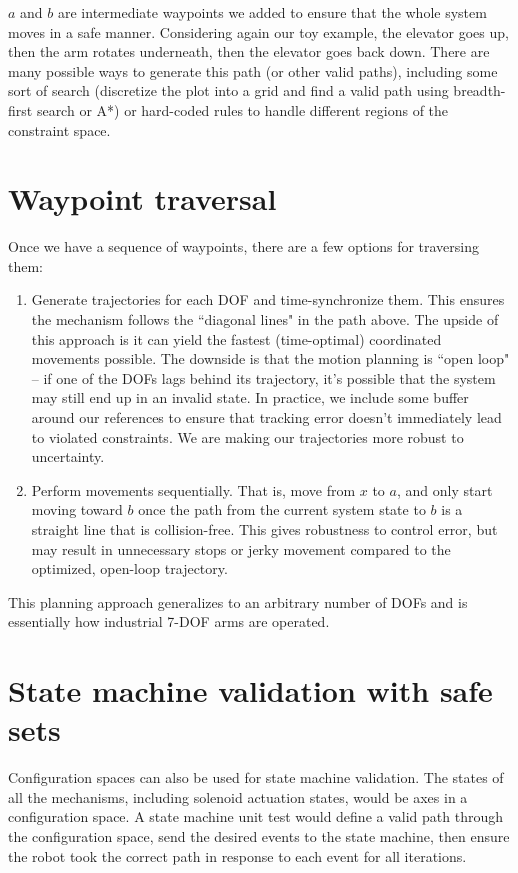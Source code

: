 $a$ and $b$ are intermediate waypoints we added to ensure that the whole system
moves in a safe manner. Considering again our toy example, the elevator goes up,
then the arm rotates underneath, then the elevator goes back down. There are
many possible ways to generate this path (or other valid paths), including some
sort of search (discretize the plot into a grid and find a valid path using
breadth-first search or A*) or hard-coded rules to handle different regions of
the constraint space.

\section{Waypoint traversal}

Once we have a sequence of waypoints, there are a few options for traversing
them:
\begin{enumerate}
  \item Generate trajectories for each DOF and time-synchronize them. This
    ensures the mechanism follows the ``diagonal lines" in the path above. The
    upside of this approach is it can yield the fastest (time-optimal)
    coordinated movements possible. The downside is that the motion planning is
    ``open loop" -- if one of the DOFs lags behind its trajectory, it's possible
    that the system may still end up in an invalid state. In practice, we
    include some buffer around our references to ensure that tracking error
    doesn't immediately lead to violated constraints. We are making our
    trajectories more robust to uncertainty.
  \item Perform movements sequentially. That is, move from $x$ to $a$, and only
    start moving toward $b$ once the path from the current system state to $b$
    is a straight line that is collision-free. This gives robustness to control
    error, but may result in unnecessary stops or jerky movement compared to the
    optimized, open-loop trajectory.
\end{enumerate}

This planning approach generalizes to an arbitrary number of DOFs and is
essentially how industrial 7-DOF arms are operated.

\section{State machine validation with safe sets}

Configuration spaces can also be used for state machine validation. The states
of all the mechanisms, including solenoid actuation states, would be axes in a
configuration space. A state machine unit test would define a valid path through
the configuration space, send the desired events to the state machine, then
ensure the robot took the correct path in response to each event for all
iterations.
